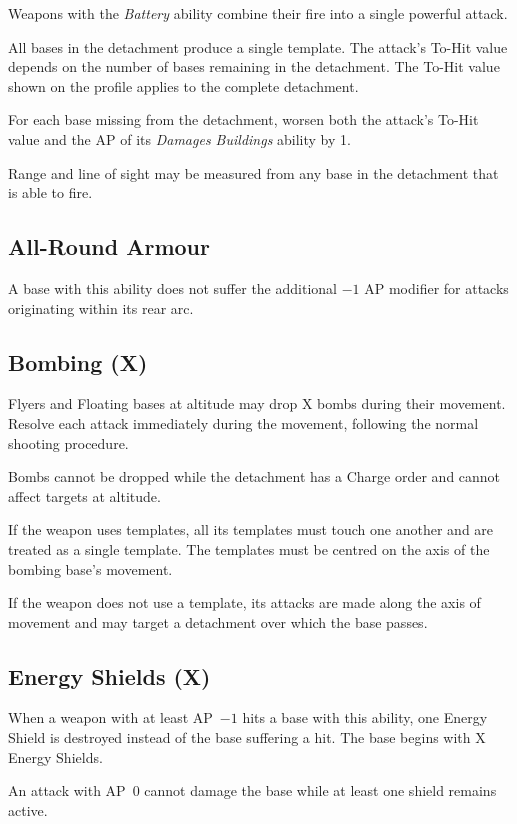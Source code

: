 Weapons with the \textit{Battery} ability combine their fire into a single powerful attack.

All bases in the detachment produce a single template. The attack's To-Hit value depends on the number of bases remaining in the detachment. The To-Hit value shown on the profile applies to the complete detachment.

For each base missing from the detachment, worsen both the attack's To-Hit value and the AP of its \textit{Damages Buildings} ability by 1.

Range and line of sight may be measured from any base in the detachment that is able to fire.

\subsection{All-Round Armour}

A base with this ability does not suffer the additional $-1$ AP modifier for attacks originating within its rear arc.

\subsection{Bombing (X)}

Flyers and Floating bases at altitude may drop X bombs during their movement. Resolve each attack immediately during the movement, following the normal shooting procedure.

Bombs cannot be dropped while the detachment has a Charge order and cannot affect targets at altitude.

If the weapon uses templates, all its templates must touch one another and are treated as a single template. The templates must be centred on the axis of the bombing base's movement.

If the weapon does not use a template, its attacks are made along the axis of movement and may target a detachment over which the base passes.

\subsection{Energy Shields (X)}

When a weapon with at least AP~$-1$ hits a base with this ability, one Energy Shield is destroyed instead of the base suffering a hit. The base begins with X Energy Shields.

An attack with AP~0 cannot damage the base while at least one shield remains active.

